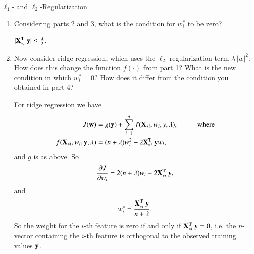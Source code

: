 \documentclass[section]{problemset}
\begin{document}
\begin{problem}{$\ell_1$- and $\ell_2$-Regularization}
\begin{enumerate}
\begin{mdframed}
For $w_i \leq 0$, the $i$-th component of $J(\w)$ is
\begin{align*}
  J(\w)_i = nw_i^2 - w_i (\lambda  + 2\X_{*i}^\T ~\y) + \constant.
\end{align*}
so
\begin{align*}
  \partiald{J}{w_i} = 2nw_i - \lambda - 2\X_{*i}^\T ~\y,
\end{align*}
and setting the gradient equal to zero gives
\begin{align*}
  w^*_i =
  \begin{cases}
    \frac{ \lambda + 2\X_{*i}^\T ~\y }{2n}, &\X_{*i}^\T ~\y  < -\frac{\lambda}{2}\\
    0,                                     &\text{otherwise}.
  \end{cases}
\end{align*}
\end{mdframed}


\item
Considering parts 2 and 3, what is the condition for $w_i^*$ to be zero?
\begin{mdframed}
  $|\mathbf X_{*i}^{\mathbf{T}} ~\mathbf y| \leq \frac{\lambda}{2}$.
\end{mdframed}

\item
Now consider ridge regression, which uses the $\ell_2$ regularization term $\lambda \, |w|^2$.
How does this change the function $f(\cdot)$ from part 1?
What is the new condition in which $w_i^* = 0$?
How does it differ from the condition you obtained in part 4?

\begin{mdframed}
For ridge regression we have
\begin{align*}
  J(\mathbf w) &= g(\mathbf y) + \sum_{i=1}^d f(\mathbf X_{*i}, w_i, y, \lambda), ~~~~~~~~~~~\text{where}\\
  f(\mathbf X_{*i}, w_i, \mathbf y, \lambda) &= (n+\lambda)w_i^2 - 2\mathbf X_{*i}^{\mathbf{T}} ~\mathbf y w_i,
\end{align*}
and $g$ is as above. So
\begin{align*}
  \frac{\partial J}{\partial w_i} = 2(n + \lambda)w_i - 2\mathbf X_{*i}^{\mathbf{T}} ~\mathbf y,
\end{align*}
and
\begin{align*}
  w^*_i = \frac{ \mathbf X_{*i}^{\mathbf{T}} ~\mathbf y }{n + \lambda}.
\end{align*}
So the weight for the $i$-th feature is zero if and only if
$\mathbf X_{*i}^{\mathbf{T}} ~\mathbf y = 0$, i.e. the $n$-vector containing the $i$-th feature is
orthogonal to the observed training values $\mathbf y$.


\end{mdframed}
\end{enumerate}
\end{problem}
\end{document}
